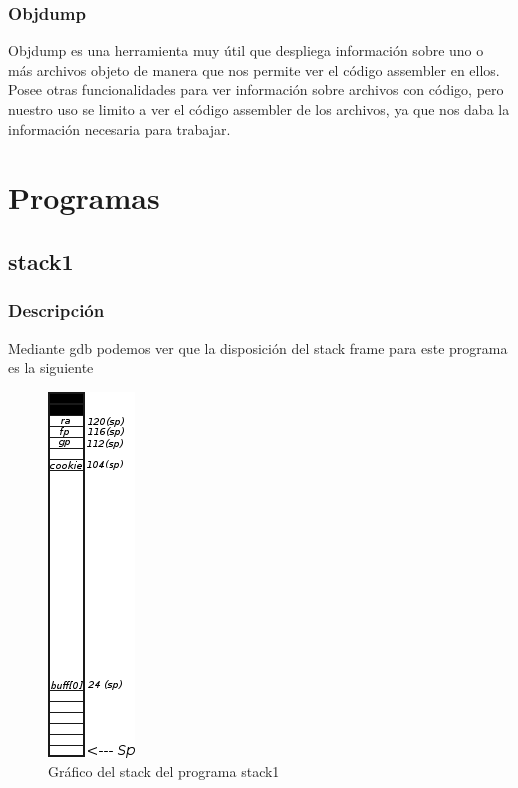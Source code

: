 \documentclass[a4paper,10pt]{article}
\begin{document}
\subsubsection{Objdump}

Objdump es una herramienta muy útil que despliega información sobre uno o más archivos objeto de manera que nos permite ver el código assembler en ellos. Posee otras funcionalidades para ver información sobre archivos con código, pero nuestro uso se limito a ver el código assembler de los archivos, ya que nos daba la información necesaria para trabajar.

\newpage
\section{Programas}
\subsection{stack1}
\lstset{ language = C, numbers=left, tabsize=4, breaklines=true, frame=single }


\subsubsection{Descripción}

\bigskip
Mediante gdb podemos ver que la disposición del stack frame para este programa es la siguiente

\bigskip

\begin{figure}[h!]
	\centering
	\includegraphics[scale=0.7]{./recursos/stack1.png}
	\caption{Gr\'afico del stack del programa stack1}
    \label{fig:stack1}
\end{figure}
\end{document}

